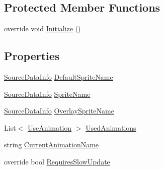 \subsection*{Protected Member Functions}
\begin{DoxyCompactItemize}
\item 
override void \hyperlink{class_project_porcupine_1_1_buildable_1_1_components_1_1_visuals_a9ddca8a9a68c0f79a7475025d3b08205}{Initialize} ()
\end{DoxyCompactItemize}
\subsection*{Properties}
\begin{DoxyCompactItemize}
\item 
\hyperlink{class_project_porcupine_1_1_buildable_1_1_components_1_1_buildable_component_1_1_source_data_info}{Source\+Data\+Info} \hyperlink{class_project_porcupine_1_1_buildable_1_1_components_1_1_visuals_a8afc4e8d785c6aeb0e7cc8d84d384249}{Default\+Sprite\+Name}
\item 
\hyperlink{class_project_porcupine_1_1_buildable_1_1_components_1_1_buildable_component_1_1_source_data_info}{Source\+Data\+Info} \hyperlink{class_project_porcupine_1_1_buildable_1_1_components_1_1_visuals_af453a5211a032799b5245a9606ad2fdc}{Sprite\+Name}
\item 
\hyperlink{class_project_porcupine_1_1_buildable_1_1_components_1_1_buildable_component_1_1_source_data_info}{Source\+Data\+Info} \hyperlink{class_project_porcupine_1_1_buildable_1_1_components_1_1_visuals_a33545a2191658a5404828a9785fc5c46}{Overlay\+Sprite\+Name}
\item 
List$<$ \hyperlink{class_project_porcupine_1_1_buildable_1_1_components_1_1_buildable_component_1_1_use_animation}{Use\+Animation} $>$ \hyperlink{class_project_porcupine_1_1_buildable_1_1_components_1_1_visuals_a13ee720e5a055efc05e6e383ce8ead80}{Used\+Animations}
\item 
string \hyperlink{class_project_porcupine_1_1_buildable_1_1_components_1_1_visuals_a3513bdad704aff7b44b4616321f691b7}{Current\+Animation\+Name}
\item 
override bool \hyperlink{class_project_porcupine_1_1_buildable_1_1_components_1_1_visuals_a1c6f6bbf20c3132a18340e46969dddd9}{Requires\+Slow\+Update}
\end{DoxyCompactItemize}
